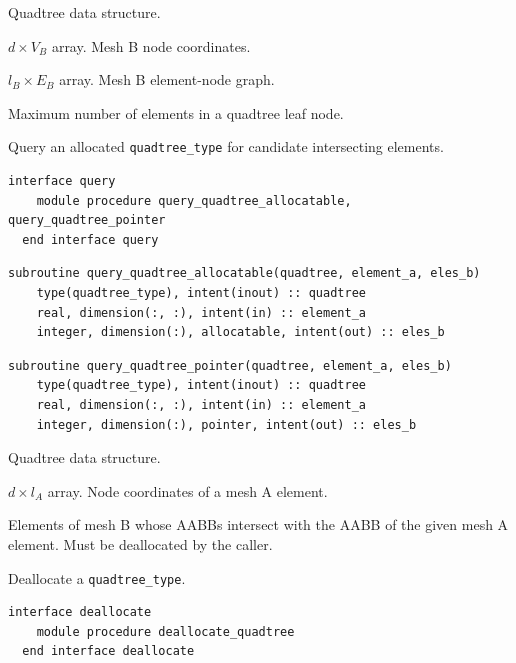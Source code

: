 \documentclass{article}
\begin{document}
\begin{description}[font=\ttfamily\bfseries,leftmargin=2.2\parindent,labelindent=1.7\parindent,noitemsep]
  \item[quadtree] Quadtree data structure.
  \item[positions] $d \times V_B$ array. Mesh B node coordinates.
  \item[enlist] $l_B \times E_B$ array. Mesh B element-node graph.
  \item[max\_size] Maximum number of elements in a quadtree leaf node.
\end{description}

\noindent Query an allocated \verb+quadtree_type+ for candidate intersecting
elements.
  
\begin{lstlisting}[language=FORTRAN]
  interface query
    module procedure query_quadtree_allocatable, query_quadtree_pointer
  end interface query
\end{lstlisting}
    
\begin{lstlisting}[language=FORTRAN]
  subroutine query_quadtree_allocatable(quadtree, element_a, eles_b)
    type(quadtree_type), intent(inout) :: quadtree
    real, dimension(:, :), intent(in) :: element_a
    integer, dimension(:), allocatable, intent(out) :: eles_b
\end{lstlisting}
  
\begin{lstlisting}[language=FORTRAN]
  subroutine query_quadtree_pointer(quadtree, element_a, eles_b)
    type(quadtree_type), intent(inout) :: quadtree
    real, dimension(:, :), intent(in) :: element_a
    integer, dimension(:), pointer, intent(out) :: eles_b
\end{lstlisting}

\begin{description}[font=\ttfamily\bfseries,leftmargin=2.2\parindent,labelindent=1.7\parindent,noitemsep]
  \item[quadtree] Quadtree data structure.
  \item[element\_a] $d \times l_A$ array. Node coordinates of a mesh A element.
  \item[eles\_b] Elements of mesh B whose AABBs intersect with the AABB of the
    given mesh A element. Must be deallocated by the caller.
\end{description}

\noindent Deallocate a \verb+quadtree_type+.
  
\begin{lstlisting}[language=FORTRAN]
  interface deallocate
    module procedure deallocate_quadtree
  end interface deallocate
\end{lstlisting}
  
\end{document}
